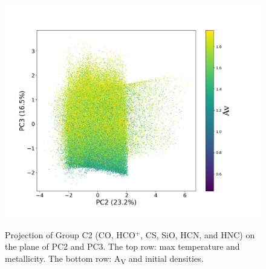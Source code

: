 \documentclass{aa}
\begin{document}
\begin{CJK*}{UTF8}{gbsn}
\begin{figure}[htbp]
{        \label{C2-23-av}
        \includegraphics[scale = 0.27]{6/PC2&3_av.png}
        }
        \caption{Projection of Group C2 (CO, HCO$^+$, CS, SiO, HCN, and HNC) on the plane of PC2 and PC3. The top row: max temperature and metallicity. The bottom row: A\textsubscript{V} and initial densities.}
        \label{C2-23}
    \end{figure}
   

\end{CJK*}
\end{document}
